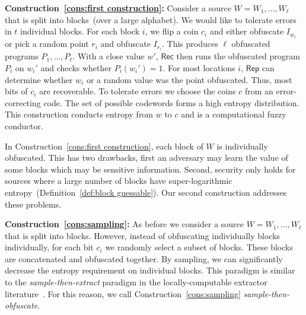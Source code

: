 \documentclass[11pt]{article}
\newcommand{\defref}[1]{\mbox{Definition~\ref{#1}}}
\newcommand{\consref}[1]{\mbox{Construction~\ref{#1}}}
\newcommand{\class}[1]{{\ensuremath{\mathsf{#1}}}}
\newcommand{\rep}{\ensuremath{\class{Rep}}\xspace}
\newcommand{\rec}{\ensuremath{\class{Rec}}\xspace}
\begin{document}
\textbf{\consref{cons:first construction}: }
Consider a source $W = W_1,..., W_\ell$ that is split into blocks~(over a large alphabet).  We would like to tolerate errors in $t$ individual blocks.  For each block $i$, we flip a coin $c_i$ and either obfuscate $I_{w_i}$ or pick a random point $r_i$ and obfuscate $I_{r_i}$.  This produces $\ell$ obfuscated programs $P_1,..., P_\ell$.  With a close value $w'$, $\rec$ then runs the obfuscated program $P_i$ on $w_i'$ and checks whether $P_i(w_i')=1$.  For most locations $i$, \rep can determine whether $w_i$ or a random value was the point obfuscated.  Thus, most bits of $c_i$ are recoverable. To tolerate errors we choose the coins $c$ from an error-correcting code.  The set of possible codewords forms a high entropy distribution.  This construction conducts entropy from $w$ to $c$ and is a computational fuzzy conductor.  

In \consref{cons:first construction}, each block of $W$ is individually obfuscated.  This has two drawbacks, first an adversary may learn the value of some blocks which may be sensitive information.  Second, security only holds for sources where a large number of blocks have super-logarithmic entropy~(\defref{def:block guessable}).  Our second construction addresses these problems.  

\textbf{\consref{cons:sampling}: }  
As before we consider a source $W=W_1,...,W_\ell$ that is split into blocks.  However, instead of obfuscating individually  
blocks individually, for each bit $c_i$ we randomly select a subset of blocks.  These blocks are concatenated and obfuscated together.  By sampling, we can significantly decrease the entropy requirement on individual blocks.  This paradigm is similar to the \emph{sample-then-extract} paradigm in the locally-computable extractor literature~\cite{lu2002hyper,vadhan2003constructing}.  For this reason, we call \consref{cons:sampling} \emph{sample-then-obfuscate}.

\end{document}
